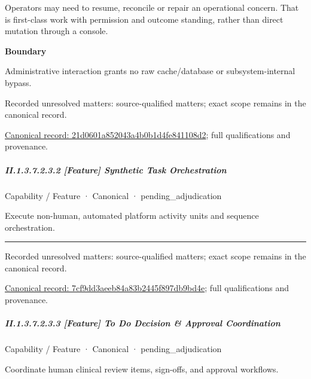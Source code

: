 Operators may need to resume, reconcile or repair an operational concern. That is first-class work with permission and outcome standing, rather than direct mutation through a console.



\textbf{Boundary}



Administrative interaction grants no raw cache/database or subsystem-internal bypass.


{\small Recorded unresolved matters: source-qualified matters; exact scope remains in the canonical record.}\par
{\footnotesize \href{../../../../continuum/strategy/capability/feature/21d0601a852043a4b0b1d4fe841108d2.md}{Canonical record: 21d0601a852043a4b0b1d4fe841108d2}; full qualifications and provenance.}\par
\subparagraph*{II.1.3.7.2.3.2 [Feature] Synthetic Task Orchestration}
\label{navigation:II.1.3.7.2.3.2}

\label{element:7cf9dd3aeeb84a83b2445f897db9bd4e}
{\small Capability / Feature · Canonical · pending\_adjudication}\par

Execute non-human, automated platform activity units and sequence orchestration.



\medskip\hrule\medskip

{\small Recorded unresolved matters: source-qualified matters; exact scope remains in the canonical record.}\par
{\footnotesize \href{../../../../continuum/strategy/capability/feature/7cf9dd3aeeb84a83b2445f897db9bd4e.md}{Canonical record: 7cf9dd3aeeb84a83b2445f897db9bd4e}; full qualifications and provenance.}\par
\subparagraph*{II.1.3.7.2.3.3 [Feature] To Do Decision \& Approval Coordination}
\label{navigation:II.1.3.7.2.3.3}

\label{element:377a40e8f2d64840a10dd55f87a9d005}
{\small Capability / Feature · Canonical · pending\_adjudication}\par

Coordinate human clinical review items, sign-offs, and approval workflows.



